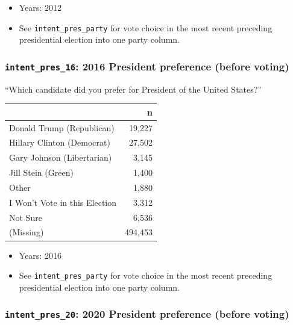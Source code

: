 \documentclass[10pt,article,oneside]{memoir}
\theoremstyle{definition}
\begin{document}
\begin{itemize}
\tightlist
\item
  Years: 2012
\item
  See \texttt{intent\_pres\_party} for vote choice in the most recent
  preceding presidential election into one party column.
\end{itemize}

\hypertarget{intent_pres_16-2016-president-preference-before-voting}{%
\subsubsection{\texorpdfstring{\texttt{intent\_pres\_16}: 2016 President
preference (before
voting)}{intent\_pres\_16: 2016 President preference (before voting)}}\label{intent_pres_16-2016-president-preference-before-voting}}

``Which candidate did you prefer for President of the United States?''

\begin{table}[H]
\centering
\begin{tabular}[t]{lr}
\toprule
 & n\\
\midrule
Donald Trump (Republican) & 19,227\\
Hillary Clinton (Democrat) & 27,502\\
Gary Johnson (Libertarian) & 3,145\\
Jill Stein (Green) & 1,400\\
Other & 1,880\\
I Won't Vote in this Election & 3,312\\
Not Sure & 6,536\\
(Missing) & 494,453\\
\bottomrule
\end{tabular}
\end{table}

\begin{itemize}
\tightlist
\item
  Years: 2016
\item
  See \texttt{intent\_pres\_party} for vote choice in the most recent
  preceding presidential election into one party column.
\end{itemize}

\hypertarget{intent_pres_20-2020-president-preference-before-voting}{%
\subsubsection{\texorpdfstring{\texttt{intent\_pres\_20}: 2020 President
preference (before
voting)}{intent\_pres\_20: 2020 President preference (before voting)}}\label{intent_pres_20-2020-president-preference-before-voting}}
\end{document}
